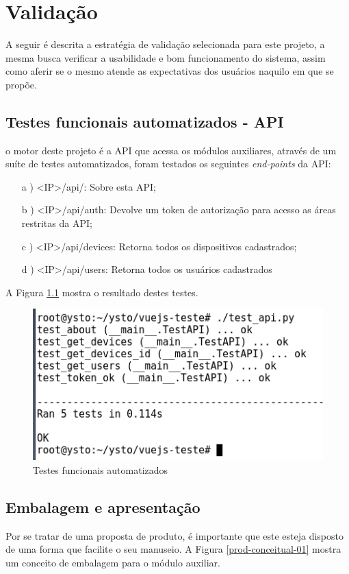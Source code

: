 \chapter{Validação}

A seguir é descrita a estratégia de validação selecionada para este projeto, a mesma busca verificar a usabilidade e bom funcionamento do sistema, assim como aferir se o mesmo atende as expectativas dos usuários naquilo em que se propõe.

\section{Testes funcionais automatizados - API}
o motor deste projeto é a API que acessa os módulos auxiliares, através de um suíte de testes automatizados, foram testados os seguintes \textit{end-points} da API:

\begin{itemize}
    \item[a]) <IP>/api/: Sobre esta API;
    \item[b]) <IP>/api/auth: Devolve um token de autorização para acesso as áreas restritas da API;
    \item[c]) <IP>/api/devices: Retorna todos os dispositivos cadastrados;
    \item[d]) <IP>/api/users: Retorna todos os usuários cadastrados
\end{itemize}

A Figura \ref{teste-api} mostra o resultado destes testes.

\begin{figure}[H]
\caption{\label{teste-api} Testes funcionais automatizados}
\includegraphics[scale=0.5]{img/test_api.png}
\end{figure}

\section{Embalagem e apresentação}
Por se tratar de uma proposta de produto, é importante que este esteja disposto de uma forma que facilite o seu manuseio. A Figura \ref{prod-conceitual-01} mostra um conceito de embalagem para o módulo auxiliar.

